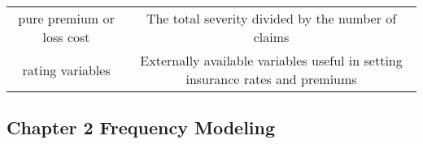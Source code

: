\documentclass[]{book}
\theoremstyle{definition}
\theoremstyle{definition}
\theoremstyle{definition}
\theoremstyle{remark}
\begin{document}
\begin{longtable}[]{@{}cc@{}}
\begin{minipage}[t]{0.41\columnwidth}\centering\strut
pure premium or loss cost\strut
\end{minipage} & \begin{minipage}[t]{0.42\columnwidth}\centering\strut
The total severity divided by the number of claims\strut
\end{minipage}\tabularnewline
\begin{minipage}[t]{0.41\columnwidth}\centering\strut
rating variables\strut
\end{minipage} & \begin{minipage}[t]{0.42\columnwidth}\centering\strut
Externally available variables useful in setting insurance rates and
premiums\strut
\end{minipage}\tabularnewline
\bottomrule
\end{longtable}

\subsection{Chapter 2 Frequency
Modeling}\label{chapter-2-frequency-modeling}
\end{document}
